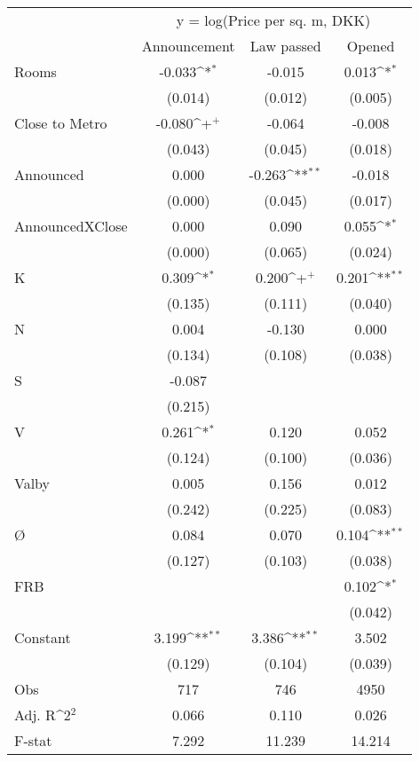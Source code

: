 {
\def\sym#1{\ifmmode^{#1}\else\(^{#1}\)\fi}
\begin{tabular}{@{\extracolsep{2pt}}l*{3}{c}@{}}
\hline\hline
& \multicolumn{3}{c}{y = log(Price per sq. m, DKK)} \\
\cline{2-4}
 & Announcement & Law passed & Opened \\
\hline
Rooms & -0.033\sym{*} & -0.015 & 0.013\sym{*} \\
 & (0.014) & (0.012) & (0.005) \\
Close to Metro & -0.080\sym{+} & -0.064 & -0.008 \\
 & (0.043) & (0.045) & (0.018) \\
Announced & 0.000 & -0.263\sym{**} & -0.018 \\
 & (0.000) & (0.045) & (0.017) \\
AnnouncedXClose & 0.000 & 0.090 & 0.055\sym{*} \\
 & (0.000) & (0.065) & (0.024) \\
K & 0.309\sym{*} & 0.200\sym{+} & 0.201\sym{**} \\
 & (0.135) & (0.111) & (0.040) \\
N & 0.004 & -0.130 & 0.000 \\
 & (0.134) & (0.108) & (0.038) \\
S & -0.087 &  &  \\
 & (0.215) &  &  \\
V & 0.261\sym{*} & 0.120 & 0.052 \\
 & (0.124) & (0.100) & (0.036) \\
Valby & 0.005 & 0.156 & 0.012 \\
 & (0.242) & (0.225) & (0.083) \\
Ø & 0.084 & 0.070 & 0.104\sym{**} \\
 & (0.127) & (0.103) & (0.038) \\
FRB &  &  & 0.102\sym{*} \\
 &  &  & (0.042) \\
Constant & 3.199\sym{**} & 3.386\sym{**} & 3.502 \\
 & (0.129) & (0.104) & (0.039) \\

\hline
Obs & 717 & 746 & 4950 \\
Adj. R\sym{2} & 0.066 & 0.110 & 0.026 \\
F-stat & 7.292 & 11.239 & 14.214 \\
\hline\hline
\end{tabular}
}